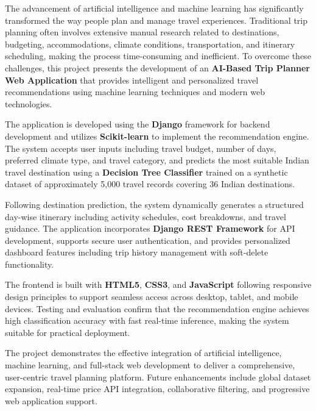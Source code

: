 {
\fontsize{12}{14}\selectfont
\noindent
The advancement of artificial intelligence and machine learning has significantly transformed the way people plan and manage travel experiences. Traditional trip planning often involves extensive manual research related to destinations, budgeting, accommodations, climate conditions, transportation, and itinerary scheduling, making the process time-consuming and inefficient. To overcome these challenges, this project presents the development of an \textbf{AI-Based Trip Planner Web Application} that provides intelligent and personalized travel recommendations using machine learning techniques and modern web technologies.

\noindent
The application is developed using the \textbf{Django} framework for backend development and utilizes \textbf{Scikit-learn} to implement the recommendation engine. The system accepts user inputs including travel budget, number of days, preferred climate type, and travel category, and predicts the most suitable Indian travel destination using a \textbf{Decision Tree Classifier} trained on a synthetic dataset of approximately 5,000 travel records covering 36 Indian destinations.

\noindent
Following destination prediction, the system dynamically generates a structured day-wise itinerary including activity schedules, cost breakdowns, and travel guidance. The application incorporates \textbf{Django REST Framework} for API development, supports secure user authentication, and provides personalized dashboard features including trip history management with soft-delete functionality.

\noindent
The frontend is built with \textbf{HTML5}, \textbf{CSS3}, and \textbf{JavaScript} following responsive design principles to support seamless access across desktop, tablet, and mobile devices. Testing and evaluation confirm that the recommendation engine achieves high classification accuracy with fast real-time inference, making the system suitable for practical deployment.

\noindent
The project demonstrates the effective integration of artificial intelligence, machine learning, and full-stack web development to deliver a comprehensive, user-centric travel planning platform. Future enhancements include global dataset expansion, real-time price API integration, collaborative filtering, and progressive web application support.
}
